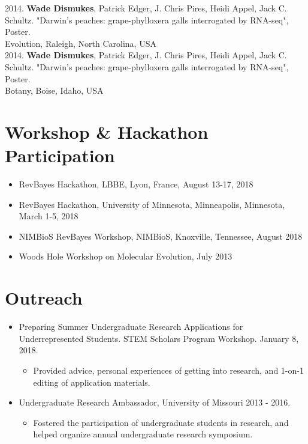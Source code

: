 \documentclass[12pt]{article}
\begin{document}
2014. \textbf{Wade Dismukes}, Patrick Edger, J. Chris Pires, Heidi Appel, Jack C. Schultz. "Darwin's peaches: grape-phylloxera galls interrogated by RNA-seq", Poster. \\
Evolution, Raleigh, North Carolina, USA  \\

2014. \textbf{Wade Dismukes}, Patrick Edger, J. Chris Pires, Heidi Appel, Jack C. Schultz. "Darwin's peaches: grape-phylloxera galls interrogated by RNA-seq", Poster. \\
Botany, Boise, Idaho, USA \\


\section{Workshop \& Hackathon Participation}
\begin{itemize}
    \item RevBayes Hackathon, LBBE, Lyon, France, August 13-17, 2018
    \item RevBayes Hackathon, University of Minnesota, Minneapolis, Minnesota, March 1-5, 2018
    \item NIMBioS RevBayes Workshop, NIMBioS, Knoxville, Tennessee, August 2018
    \item Woods Hole Workshop on Molecular Evolution, July 2013
\end{itemize}


\section{Outreach}
\begin{itemize}
\item Preparing Summer Undergraduate Research Applications for Underrepresented Students. STEM Scholars Program Workshop. January 8, 2018.
    \begin{itemize}
           \item Provided advice, personal experiences of getting into research, and 1-on-1 editing of application materials.
    \end{itemize} 
\item Undergraduate Research Ambassador, University of Missouri 2013 - 2016.
    \begin{itemize}
           \item Fostered the participation of undergraduate students in research, and helped organize annual undergraduate research symposium.
     \end{itemize}
\end{itemize}
\end{document}
